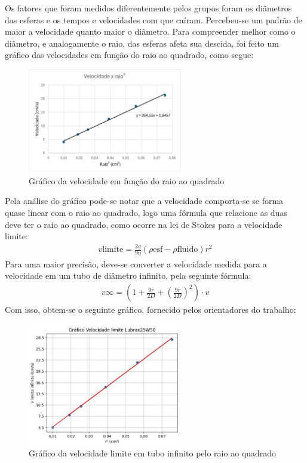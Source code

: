 Os fatores que foram medidos diferentemente pelos grupos foram os diâmetros das esferas e os tempos e velocidades com que caíram. Percebeu-se um padrão de maior a velocidade quanto maior o diâmetro. Para compreender melhor como o diâmetro, e analogamente o raio, das esferas afeta sua descida, foi feito um gráfico das velocidades em função do raio ao quadrado, como segue:
\begin{figure}[H]
    \centering
    \includegraphics[width=0.6\textwidth]{fig/GraficoViscosimetroV2.jpg}
    \caption{Gráfico da velocidade em função do raio ao quadrado}
    \label{fig:grafVisc}
\end{figure}
Pela análise do gráfico pode-se notar que a velocidade comporta-se se forma quase linear com o raio ao quadrado, logo uma fórmula que relacione as duas deve ter o raio ao quadrado, como ocorre na lei de Stokes para a velocidade limite:
\begin{align*}
    v\text{limite} =\frac{2g}{9\eta}(\rho \text{esf}- \rho \text{fluido})r^2
\end{align*}
Para uma maior precisão, deve-se converter a velocidade medida para a velocidade em um tubo de diâmetro infinito, pela seguinte fórmula:
\begin{align*}
    v \infty = \left(1 + \frac{9r}{2D} + \left(\frac{9r}{2D}\right)^2\right) \cdot v 
\end{align*}
Com isso, obtem-se o seguinte gráfico, fornecido pelos orientadores do trabalho:
\begin{figure}[H]
    \centering
    \includegraphics[width=0.6\textwidth]{fig/GraficoOrientadores.jpg}
    \caption{Gráfico da velocidade limite em tubo infinito pelo raio ao quadrado}
    \label{fig:grafVisc2}
\end{figure}

